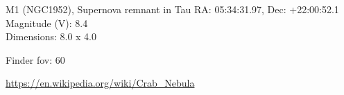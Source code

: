 \begin{block}{M1 (NGC1952), Supernova remnant in Tau}
    RA: 05:34:31.97, Dec: +22:00:52.1 \\ 
    Magnitude (V): 8.4 \\ 
    Dimensions: 8.0 x 4.0 

    Finder fov: 60 

    \url{https://en.wikipedia.org/wiki/Crab_Nebula} 
\end{block}